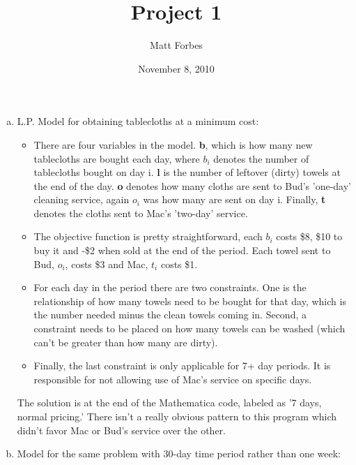 \documentclass[a4paper,12pt]{article}
\begin{document}
\title{Project 1}
\author{Matt Forbes}
\date{November 8, 2010}
\maketitle

\begin{enumerate}[a)]
    \item L.P. Model for obtaining tablecloths at a minimum cost:

      \begin{itemize}
        \item
          There are four variables in the model. {\bf b}, which is how many
          new tablecloths are bought each day, where \(b_i\) denotes the number of tablecloths
          bought on day i. {\bf l} is the number of leftover (dirty) towels
          at the end of the day. {\bf o} denotes how many cloths are sent to Bud's 'one-day'
          cleaning service, again \(o_i\) was how many are sent on day i. Finally,
          {\bf t} denotes the cloths sent to Mac's 'two-day' service.

        \item
          The objective function is pretty straightforward, each \(b_i\) costs \$8, \$10 to
          buy it and -\$2 when sold at the end of the period. Each towel sent to Bud, \(o_i\), costs \$3 and
          Mac, \(t_i\) costs \$1. 

        \item
          For each day in the period there are two constraints. One is the relationship of how many towels need
          to be bought for that day, which is the number needed minus the clean towels coming in. Second, a
          constraint needs to be placed on how many towels can be washed (which can't be greater than how many
          are dirty).

        \item
          Finally, the last constraint is only applicable for 7+ day periods. It is responsible for not
          allowing use of Mac's service on specific days.

      \end{itemize}

      The solution is at the end of the Mathematica code, labeled as '7 days, normal pricing.' There isn't a
      really obvious pattern to this program which didn't favor Mac or Bud's service over the other.

    \item Model for the same problem with 30-day time period rather than one week:


\end{enumerate}
\end{document}
